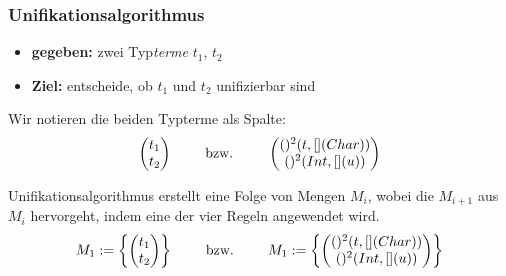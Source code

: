 \documentclass{beamer}
\begin{document}
\begin{frame}\frametitle{Unifikationsalgorithmus}
	\footnotesize
	\begin{itemize}
		\item \textbf{gegeben:} zwei Typ\textit{terme} $t_1$, $t_2$ 
		\item \textbf{Ziel:} entscheide, ob $t_1$ und $t_2$ unifizierbar sind
	\end{itemize}
	
	Wir notieren die beiden Typterme als Spalte:
	\begin{equation*}
		\begin{pmatrix}
			t_1 \\ t_2
		\end{pmatrix} 
		\qquad \text{ bzw. } \qquad 
		\begin{pmatrix}
			()^2(t, [](Char)) \\ ()^2(Int, [](u))
		\end{pmatrix} 
	\end{equation*}
	
	Unifikationsalgorithmus erstellt eine Folge von Mengen $M_i$, wobei die $M_{i+1}$ aus $M_i$ hervorgeht, indem eine der vier Regeln angewendet wird.
	\begin{equation*}
		M_1 \mathrel{:=} \left\{ \begin{pmatrix}
			t_1 \\ t_2
		\end{pmatrix} \right\}
		\qquad \text{ bzw. } \qquad 
		M_1 \mathrel{:=} \left\{ \begin{pmatrix}
			()^2(t, [](Char)) \\ ()^2(Int, [](u))
		\end{pmatrix} \right\}
	\end{equation*}
\end{frame}
\end{document}
